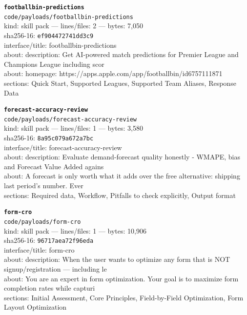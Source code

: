 \noindent\textbf{\texttt{footballbin-predictions}}\\
\texttt{code/payloads/footballbin-predictions}\\
kind: skill pack --- lines/files: 2 --- bytes: 7,050\\
sha256-16: \texttt{ef904472741dd3c9}\\
interface/title: footballbin-predictions\\
about: description: Get AI-powered match predictions for Premier League and Champions League including scor\\
about: homepage: https://apps.apple.com/app/footballbin/id6757111871\\
sections: Quick Start, Supported Leagues, Supported Team Aliases, Response Data\\
\vspace*{6.0pt}

\noindent\textbf{\texttt{forecast-accuracy-review}}\\
\texttt{code/payloads/forecast-accuracy-review}\\
kind: skill pack --- lines/files: 1 --- bytes: 3,580\\
sha256-16: \texttt{8a95c079a672a7bc}\\
interface/title: forecast-accuracy-review\\
about: description: Evaluate demand-forecast quality honestly - WMAPE, bias and Forecast Value Added agains\\
about: A forecast is only worth what it adds over the free alternative: shipping last period's number. Ever\\
sections: Required data, Workflow, Pitfalls to check explicitly, Output format\\
\vspace*{6.0pt}

\noindent\textbf{\texttt{form-cro}}\\
\texttt{code/payloads/form-cro}\\
kind: skill pack --- lines/files: 1 --- bytes: 10,906\\
sha256-16: \texttt{96717aea72f96eda}\\
interface/title: form-cro\\
about: description: When the user wants to optimize any form that is NOT signup/registration — including le\\
about: You are an expert in form optimization. Your goal is to maximize form completion rates while capturi\\
sections: Initial Assessment, Core Principles, Field-by-Field Optimization, Form Layout Optimization\\
\vspace*{6.0pt}


